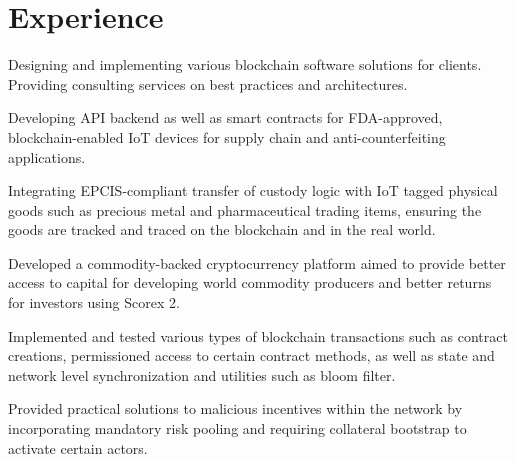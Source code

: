 \documentclass[]{deedy-resume-openfont}
\begin{document}
\begin{minipage}[t]{0.73\textwidth} 


\section{Experience}

\href{https://chronicled.com}{}
\vspace{\topsep} %
\begin{tightemize}
\item Designing and implementing various blockchain software solutions for clients. Providing consulting services on best practices and architectures.
\end{tightemize}
\sectionsep

\href{https://chronicled.com}{}
\vspace{\topsep} %
\begin{tightemize}
\item Developing API backend as well as smart contracts for FDA-approved, blockchain-enabled IoT devices for supply chain and anti-counterfeiting applications.
\item Integrating EPCIS-compliant transfer of custody logic with IoT tagged physical goods such as precious metal and pharmaceutical trading items, ensuring the goods are tracked and traced on the blockchain and in the real world.
\end{tightemize}
\sectionsep

\href{https://topl.co}{}
\begin{tightemize}
\item Developed a commodity-backed cryptocurrency platform aimed to provide better access to capital for developing world commodity producers and better returns for investors using Scorex 2.
\item Implemented and tested various types of blockchain transactions such as contract creations, permissioned access to certain contract methods, as well as state and network level synchronization and utilities such as bloom filter.
\item Provided practical solutions to malicious incentives within the network by incorporating mandatory risk pooling and requiring collateral bootstrap to activate certain actors.
\end{tightemize}
\sectionsep


\end{minipage}
\end{document}
